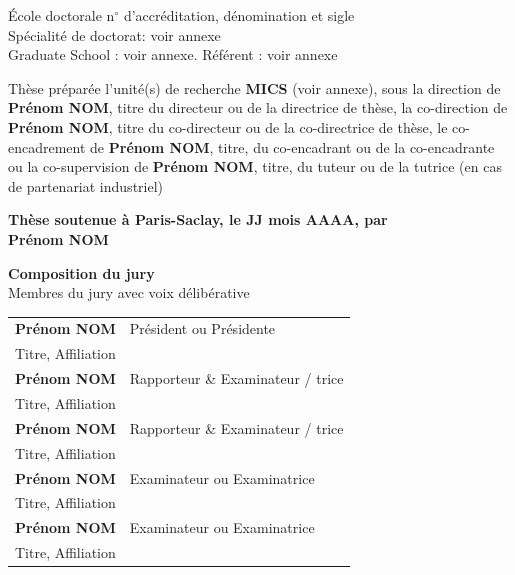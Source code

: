 \documentclass[french,12pt,a4paper]{book}
\begin{document}
\begin{titlepage}
\vspace{6mm}

\small École doctorale n$^{\circ}$ d'accréditation, dénomination et sigle\\
\small Spécialité de doctorat: voir annexe\\
\small Graduate School : voir annexe. Référent : voir annexe \\
\vspace{6mm}

\footnotesize Thèse préparée l'unité(s) de recherche \textbf{MICS} (voir annexe), sous la direction de \textbf{Prénom NOM}, titre du directeur ou de la directrice de thèse, la co-direction de \textbf{Prénom NOM}, titre du co-directeur ou de la co-directrice de thèse, le co-encadrement de \textbf{Prénom NOM}, titre, du co-encadrant ou de la co-encadrante ou la co-supervision de \textbf{Prénom NOM}, titre, du tuteur ou de la tutrice (en cas de partenariat industriel) \\
\vspace{15mm}

\textbf{Thèse soutenue à Paris-Saclay, le JJ mois AAAA, par}\\
\bigskip
\Large {\color{Prune} \textbf{Prénom NOM}} %

\vspace{\fill} %

\bigskip

\flushleft
\small {\color{Prune} \textbf{Composition du jury}}\\
{\color{Prune} \scriptsize {Membres du jury avec voix délibérative}} \\
\vspace{2mm}
\scriptsize
\begin{tabular}{|p{7cm}l}
\arrayrulecolor{Prune}
\textbf{Prénom NOM} &   Président ou Présidente\\ 
Titre, Affiliation & \\
\textbf{Prénom NOM} &  Rapporteur \& Examinateur / trice \\ 
Titre, Affiliation   &   \\ 
\textbf{Prénom NOM} &  Rapporteur \& Examinateur / trice \\ 
Titre, Affiliation  &   \\ 
\textbf{Prénom NOM} &  Examinateur ou Examinatrice \\ 
Titre, Affiliation   &   \\ 
\textbf{Prénom NOM} &  Examinateur ou Examinatrice \\ 
Titre, Affiliation   &   \\ 
 

\end{tabular} 

\end{titlepage}
\end{document}
